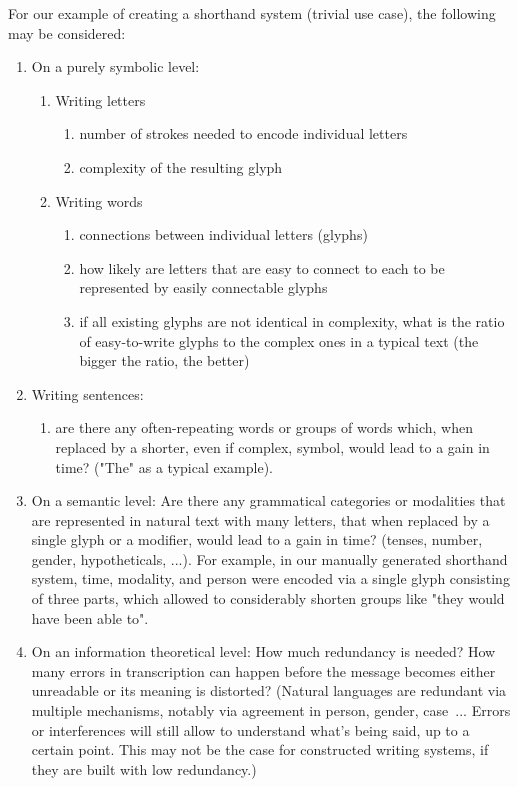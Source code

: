 \documentclass[conference]{IEEEtran}
\begin{document}
For our example of creating a shorthand system (trivial use case), the following may be considered:
\begin{enumerate}
        \item On a purely symbolic level:
        \begin{enumerate}
                \item Writing letters
                \begin{enumerate}
                        \item number of strokes needed to encode individual letters
                        \item complexity of the resulting glyph
                \end{enumerate}
                \item Writing words
                \begin{enumerate}
                        \item connections between individual letters (glyphs)
                        \item how likely are letters that are easy to connect to each to be represented by easily connectable glyphs
                        \item if all existing glyphs are not identical in complexity, what is the ratio of easy-to-write glyphs to the complex ones in a typical text (the bigger the ratio, the better)
                \end{enumerate}
        \end{enumerate}
        \item Writing sentences:
        \begin{enumerate}
                \item are there any often-repeating words or groups of words which, when replaced by a shorter, even if complex, symbol, would lead to a gain in time? ("The" as a typical example).
        \end{enumerate}
        \item On a semantic level: Are there any grammatical categories or modalities that are represented in natural text with many letters, that when replaced by a single glyph or a modifier, would lead to a gain in time? (tenses, number, gender, hypotheticals, ...). For example, in our manually generated shorthand system, time, modality, and person were encoded via a single glyph consisting of three parts, which allowed to considerably shorten groups like "they would have been able to".
        \item On an information theoretical level: How much redundancy is needed? How many errors in transcription can happen before the message becomes either unreadable or its meaning is distorted?  (Natural languages  are redundant via multiple mechanisms, notably via agreement in person, gender, case~\cite{bussmann2006routledge}... Errors or interferences will still allow to understand what’s being said, up to a certain point. This may not be the case for constructed writing systems, if they
                are built with low redundancy.)~\cite{reza1961introduction} 
\end{enumerate}
\end{document}
